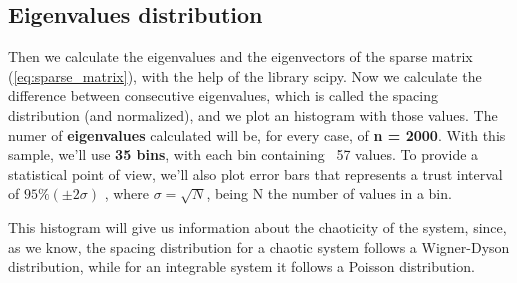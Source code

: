 \subsection{Eigenvalues distribution}
Then we calculate the eigenvalues and the eigenvectors of the sparse matrix (\ref{eq:sparse_matrix}), with the help of the library scipy. Now we calculate the difference between consecutive eigenvalues, which is called the spacing distribution (and normalized), and we plot an histogram with those values. 
The numer of \textbf{eigenvalues} calculated will be, for every case, of \textbf{n = 2000}. With this sample, we'll use \textbf{35 bins}, with each bin containing ~57 values. To provide a statistical point of view, we'll also plot error bars that represents a trust interval of \textbf{$95 \% (\pm 2\sigma)$ }, where $\sigma = \sqrt{N}$, being N the number of values in a bin. 

This histogram will give us information about the chaoticity of the system, since, as we know, the spacing distribution for a chaotic system follows a Wigner-Dyson distribution, while for an integrable system it follows a Poisson distribution.


